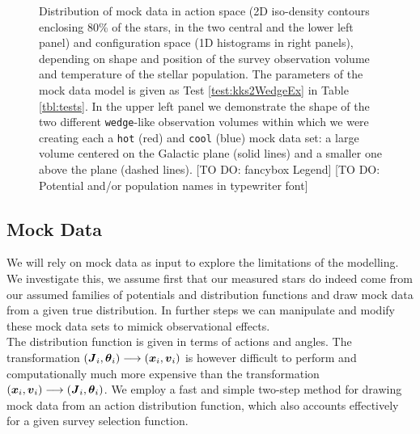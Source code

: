 

\begin{figure*}
\caption{Distribution of mock data in action space (2D iso-density contours enclosing 80\% of the stars, in the two central and the lower left panel) and configuration space (1D histograms in right panels), depending on shape and position of the survey observation volume and temperature of the stellar population. The parameters of the mock data model is given as Test \ref{test:kks2WedgeEx} in Table \ref{tbl:tests}. In the upper left panel we demonstrate the shape of the two different \texttt{wedge}-like observation volumes within which we were creating each a \texttt{hot} (red) and \texttt{cool} (blue) mock data set: a large volume centered on the Galactic plane (solid lines) and a smaller one above the plane (dashed lines). [TO DO: fancybox Legend] [TO DO: Potential and/or population names in typewriter font]} 
\label{fig:kks2WedgeEx}
\end{figure*}




\subsection{Mock Data} \label{sec:mockdata}

We will rely on mock data as input to explore the limitations of the modelling. We investigate this, we assume first that our measured stars do indeed come from our assumed families of potentials and distribution functions and draw mock data from a given true distribution. In further steps we can manipulate and modify these mock data sets to mimick observational effects.\\
The distribution function is given in terms of actions and angles. The transformation $(\boldsymbol{J}_i,\boldsymbol{\theta}_i) \longrightarrow (\boldsymbol{x}_i,\boldsymbol{v}_i)$ is however difficult to perform and computationally much more expensive than the transformation $(\boldsymbol{x}_i,\boldsymbol{v}_i) \longrightarrow (\boldsymbol{J}_i,\boldsymbol{\theta}_i)$. We employ a fast and simple two-step method for drawing mock data from an action distribution function, which also accounts effectively for a given survey selection function.\\

